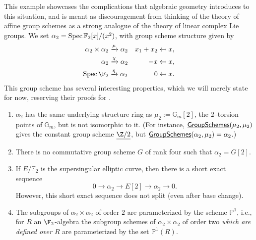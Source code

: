 \begin{example}\label{Alpha2Example}
This example showcases the complications that algebraic geometry introduces to this situation, and is meant as discouragement from thinking of the theory of affine group schemes as a strong analogue of the theory of linear complex Lie groups.  We set $\alpha_2 = \operatorname{Spec} \mathbb{F}_2[x]/(x^2)$, with group scheme structure given by
\begin{align*}
\alpha_2 \times \alpha_2 &\xrightarrow{\mu} \alpha_2 & x_1 + x_2 & \mapsfrom x, \\
\alpha_2 & \xrightarrow{\chi} \alpha_2 & -x & \mapsfrom x, \\
\Spec \F_2 & \xrightarrow{\eta} \alpha_2 & 0 & \mapsfrom x.
\end{align*}
This group scheme has several interesting properties, which we will merely state for now, reserving their proofs for .
\begin{enumerate}
\item $\alpha_2$ has the same underlying structure ring as $\mu_2 := \mathbb{G}_m[2]$, the $2$--torsion points of $\mathbb G_m$, but is not isomorphic to it.  (For instance, $\operatorname{\underline{\smash{\mathsf{GroupSchemes}}}}(\mu_2, \mu_2)$ gives the constant group scheme $\underline{\Z/2}$, but $\operatorname{\underline{\smash{\mathsf{GroupSchemes}}}}(\alpha_2, \mu_2) = \alpha_2$.)
\item There is no commutative group scheme $G$ of rank four such that $\alpha_2 = G[2]$.
\item If $E/\mathbb{F}_2$ is the supersingular elliptic curve, then there is a short exact sequence \[0 \rightarrow \alpha_2 \rightarrow E[2] \rightarrow \alpha_2 \rightarrow 0.\]  However, this short exact sequence does not split (even after base change).
\item The subgroups of $\alpha_2 \times \alpha_2$ of order $2$ are parameterized by the scheme $\mathbb{P}^1$, i.e., for $R$ an $\F_2$-algebra the subgroup schemes of $\alpha_2 \times \alpha_2$ of order two \emph{which are defined over $R$} are parameterized by the set $\mathbb{P}^1(R)$.
\end{enumerate}
\end{example}

